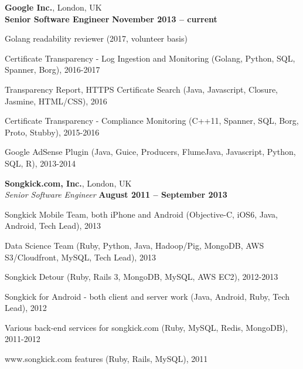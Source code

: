 \documentclass[line]{resume}
\begin{document}
\begin{resume}
    \textbf{Google Inc.}, London, UK \vspace{2mm}\\\vspace{1mm}%
    \textbf{Senior Software Engineer} \hfill \textbf{November 2013 -- current}\vspace{-3mm}\\\vspace{-1mm}%
    \begin{list2}
        \item Golang readability reviewer (2017, volunteer basis)
        \item Certificate Transparency - Log Ingestion and Monitoring (Golang, Python, SQL, Spanner, Borg), 2016-2017
        \item Transparency Report, HTTPS Certificate Search (Java, Javascript, Closure, Jasmine, HTML/CSS), 2016
        \item Certificate Transparency - Compliance Monitoring (C++11, Spanner, SQL, Borg, Proto, Stubby), 2015-2016
        \item Google AdSense Plugin (Java, Guice, Producers, FlumeJava, Javascript, Python, SQL, R), 2013-2014
    \end{list2}\vspace{-1.5mm}

    \textbf{Songkick.com, Inc.}, London, UK \vspace{2mm}\\\vspace{1mm}%
    \textsl{Senior Software Engineer} \hfill \textbf{August 2011 -- September 2013}\vspace{-3mm}\\\vspace{-1mm}%
    \begin{list2}
        \item Songkick Mobile Team, both iPhone and Android (Objective-C, iOS6, Java, Android, Tech Lead), 2013
        \item Data Science Team (Ruby, Python, Java, Hadoop/Pig, MongoDB, AWS S3/Cloudfront, MySQL, Tech Lead), 2013
        \item Songkick Detour (Ruby, Rails 3, MongoDB, MySQL, AWS EC2), 2012-2013
        \item Songkick for Android - both client and server work (Java, Android, Ruby, Tech Lead), 2012 
        \item Various back-end services for songkick.com (Ruby, MySQL, Redis, MongoDB), 2011-2012
        \item www.songkick.com features (Ruby, Rails, MySQL), 2011
    \end{list2}\vspace{-1.5mm}
    

\end{resume}
\end{document}

